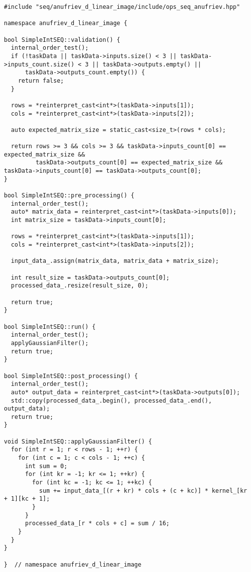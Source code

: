 \documentclass[12pt]{article}
\begin{document}
\begin{lstlisting}
#include "seq/anufriev_d_linear_image/include/ops_seq_anufriev.hpp"

namespace anufriev_d_linear_image {

bool SimpleIntSEQ::validation() {
  internal_order_test();
  if (!taskData || taskData->inputs.size() < 3 || taskData->inputs_count.size() < 3 || taskData->outputs.empty() ||
      taskData->outputs_count.empty()) {
    return false;
  }

  rows = *reinterpret_cast<int*>(taskData->inputs[1]);
  cols = *reinterpret_cast<int*>(taskData->inputs[2]);

  auto expected_matrix_size = static_cast<size_t>(rows * cols);

  return rows >= 3 && cols >= 3 && taskData->inputs_count[0] == expected_matrix_size &&
         taskData->outputs_count[0] == expected_matrix_size && taskData->inputs_count[0] == taskData->outputs_count[0];
}

bool SimpleIntSEQ::pre_processing() {
  internal_order_test();
  auto* matrix_data = reinterpret_cast<int*>(taskData->inputs[0]);
  int matrix_size = taskData->inputs_count[0];

  rows = *reinterpret_cast<int*>(taskData->inputs[1]);
  cols = *reinterpret_cast<int*>(taskData->inputs[2]);

  input_data_.assign(matrix_data, matrix_data + matrix_size);

  int result_size = taskData->outputs_count[0];
  processed_data_.resize(result_size, 0);

  return true;
}

bool SimpleIntSEQ::run() {
  internal_order_test();
  applyGaussianFilter();
  return true;
}

bool SimpleIntSEQ::post_processing() {
  internal_order_test();
  auto* output_data = reinterpret_cast<int*>(taskData->outputs[0]);
  std::copy(processed_data_.begin(), processed_data_.end(), output_data);
  return true;
}

void SimpleIntSEQ::applyGaussianFilter() {
  for (int r = 1; r < rows - 1; ++r) {
    for (int c = 1; c < cols - 1; ++c) {
      int sum = 0;
      for (int kr = -1; kr <= 1; ++kr) {
        for (int kc = -1; kc <= 1; ++kc) {
          sum += input_data_[(r + kr) * cols + (c + kc)] * kernel_[kr + 1][kc + 1];
        }
      }
      processed_data_[r * cols + c] = sum / 16;
    }
  }
}

}  // namespace anufriev_d_linear_image
\end{lstlisting}
\end{document}
